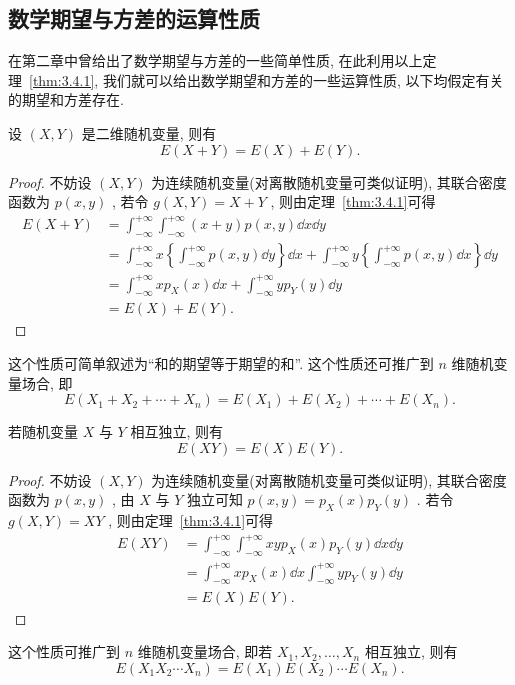   \subsection{数学期望与方差的运算性质}\label{ssec:3.4.2}
  在第二章中曾给出了数学期望与方差的一些简单性质, 在此利用以上定理~\ref{thm:3.4.1}, 我们就可以给出数学期望和方差的一些运算性质, 以下均假定有关的期望和方差存在.
  \begin{property}\label{pro:3.4.1}
  	设 $(X,Y)$ 是二维随机变量, 则有
  	\begin{equation}\label{eq:3.4.2}
  		E(X+Y)=E(X)+E(Y).
  	\end{equation}
  	\begin{proof}
  		不妨设 $(X,Y)$ 为连续随机变量(对离散随机变量可类似证明), 其联合密度函数为 $p(x,y)$ , 若令 $g(X,Y)=X+Y$ , 则由定理~\ref{thm:3.4.1}可得
  		\begin{align*}
  			E(X+Y)&=\int_{-\infty}^{+\infty} \int_{-\infty}^{+\infty}(x+y) p(x, y) \dd x \dd y\\
  			&=\int_{-\infty}^{+\infty} x\left\{\int_{-\infty}^{+\infty} p(x, y) \dd y \right\} \dd x+\int_{-\infty}^{+\infty} y\left\{\int_{-\infty}^{+\infty} p(x, y) \dd x\right\} \dd y\\
  			&=\int_{-\infty}^{+\infty} x p_{X}(x) \dd x+\int_{-\infty}^{+\infty} y p_{Y}(y) \dd y\\
  			&=E(X)+E(Y).
  		\end{align*}
  	\end{proof}
  这个性质可简单叙述为“和的期望等于期望的和”. 这个性质还可推广到 $n$ 维随机变量场合, 即
  \begin{equation}\label{eq:3.4.3}
  	E\left(X_{1}+X_{2}+\cdots+X_{n}\right)=E\left(X_{1}\right)+E\left(X_{2}\right)+\cdots+E\left(X_{n}\right).
  \end{equation}
  \end{property}
  \begin{property}\label{pro:3.4.2}
  	若随机变量 $X$ 与 $Y$ 相互独立, 则有
  	\begin{equation}\label{eq:3.4.4}
  		E(XY)=E(X)E(Y).
  	\end{equation}
  	\begin{proof}
  		不妨设 $(X,Y)$ 为连续随机变量(对离散随机变量可类似证明), 其联合密度函数为 $p(x,y)$ , 由 $X$ 与 $Y$ 独立可知 $p(x,y)=p_{X}(x)p_{Y}(y)$ . 若令 $g(X,Y)=XY$ , 则由定理~\ref{thm:3.4.1}可得
  		\begin{align*}
  			E(XY)&=\int_{-\infty}^{+\infty} \int_{-\infty}^{+\infty} x y p_{X}(x) p_{Y}(y) \dd x \dd y\\
  			&=\int_{-\infty}^{+\infty} x p_{X}(x) \dd x \int_{-\infty}^{+\infty} y p_{Y}(y) \dd y\\
  			&=E(X)E(Y).
  		\end{align*}
  	\end{proof}
  这个性质可推广到 $n$ 维随机变量场合, 即若 $X_{1}, X_{2}, \ldots, X_{n}$ 相互独立, 则有
  \begin{equation}\label{eq:3.4.5}
  	E\left(X_{1} X_{2} \cdots X_{n}\right)=E\left(X_{1}\right) E\left(X_{2}\right) \cdots E\left(X_{n}\right).
  \end{equation}
  \end{property}

